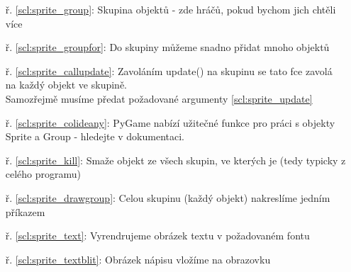 \begin{minipage}[t]{.45\textwidth}
\begin{enumerate}
\item[ř. \ref{scl:sprite_group}:] Skupina objektů - zde hráčů, pokud bychom jich chtěli více
\item[ř. \ref{scl:sprite_groupfor}:] Do skupiny můžeme snadno přidat mnoho objektů
\item[ř. \ref{scl:sprite_callupdate}:] Zavoláním update() na skupinu se tato fce zavolá na každý objekt ve skupině.\\Samozřejmě musíme předat požadované argumenty \ref{scl:sprite_update}
\vspace{0.5cm}
\item[ř. \ref{scl:sprite_colideany}:] PyGame nabízí užitečné funkce pro práci s objekty Sprite a Group - hledejte v dokumentaci.
\item[ř. \ref{scl:sprite_kill}:] Smaže objekt ze všech skupin, ve kterých je (tedy typicky z celého programu)

\item[ř. \ref{scl:sprite_drawgroup}:] Celou skupinu (každý objekt) nakreslíme jedním příkazem
\vspace{0.5cm}
\item[ř. \ref{scl:sprite_text}:] Vyrendrujeme obrázek textu v požadovaném fontu
\item[ř. \ref{scl:sprite_textblit}:] Obrázek nápisu vložíme na obrazovku


\end{enumerate}
\end{minipage}





